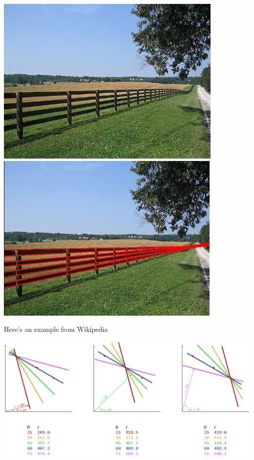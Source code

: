 \documentclass{report}
\begin{document}
\begin{center}
  \includegraphics[scale=0.6]{"images/11.png"}
  \includegraphics[scale=0.6]{"images/12.png"}
\end{center}

Here's an example from Wikipedia
\begin{center}
  \includegraphics[scale=0.35]{"images/10.png"}
\end{center}
\end{document}
